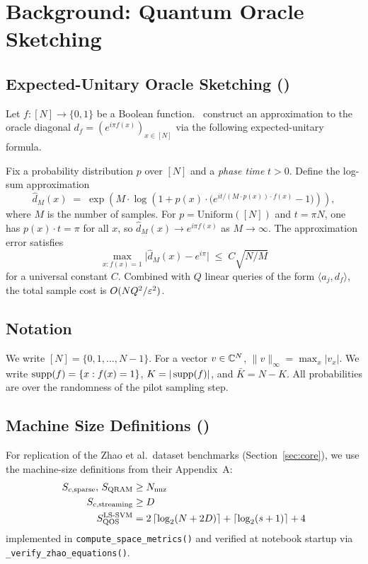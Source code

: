 \section{Background: Quantum Oracle Sketching}
\label{sec:background}

\subsection{Expected-Unitary Oracle Sketching (\Zhao)}

Let $f: [N] \to \{0,1\}$ be a Boolean function.  \Zhao\ construct an approximation to the oracle diagonal $d_f = (e^{i\pi f(x)})_{x\in[N]}$ via the following expected-unitary formula.

Fix a probability distribution $p$ over $[N]$ and a \emph{phase time} $t > 0$.  Define the log-sum approximation
\begin{equation}\label{eq:logsum}
  \hat{d}_M(x) \;=\; \exp\!\left(M \cdot \log\!\left(1 + p(x)\cdot \bigl(e^{it/(M\cdot p(x))\cdot f(x)} - 1\bigr)\right)\right),
\end{equation}
where $M$ is the number of samples.  For $p = \text{Uniform}([N])$ and $t = \pi N$, one has $p(x)\cdot t = \pi$ for all $x$, so $\hat{d}_M(x) \to e^{i\pi f(x)}$ as $M\to\infty$.  The approximation error satisfies
\begin{equation}\label{eq:zhao_bound}
  \max_{x: f(x)=1} \bigl|\hat{d}_M(x) - e^{i\pi}\bigr| \;\leq\; C\sqrt{N/M}
\end{equation}
for a universal constant $C$.  Combined with $Q$ linear queries of the form $\langle a_j, d_f\rangle$, the total sample cost is $O(NQ^2/\varepsilon^2)$.

\subsection{Notation}

We write $[N] = \{0,1,\ldots,N-1\}$.  For a vector $v\in\mathbb{C}^N$, $\|v\|_\infty = \max_x |v_x|$.  We write $\operatorname{supp}(f) = \{x: f(x)=1\}$, $K = |\operatorname{supp}(f)|$, and $\bar{K} = N - K$.  All probabilities are over the randomness of the pilot sampling step.

\subsection{Machine Size Definitions (\Zhao)}

For replication of the Zhao et al.\ dataset benchmarks (Section~\ref{sec:core}), we use the machine-size definitions from their Appendix~A:
\begin{align}
  S_{c,\text{sparse}},\, S_{\text{QRAM}} &\geq N_{\text{nnz}} \label{eq:A1} \\
  S_{c,\text{streaming}} &\geq D \label{eq:A2} \\
  S_{\text{QOS}}^{\text{LS-SVM}} &= 2\left\lceil\log_2(N+2D)\right\rceil + \left\lceil\log_2(s+1)\right\rceil + 4 \label{eq:A3}
\end{align}
implemented in \texttt{compute\_space\_metrics()} and verified at notebook startup via \texttt{\_verify\_zhao\_equations()}.
